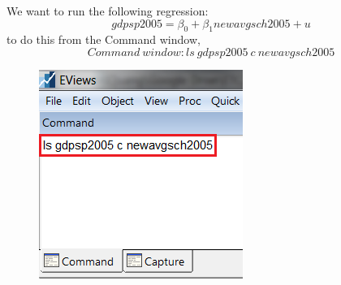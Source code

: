 \documentclass[12pt]{report}
\begin{document}
\vspace{-\baselineskip}
\noindent We want to run the following regression: $$gdpsp2005 = \beta_0 + \beta_1 newavgsch2005 + u$$
\noindent to do this from the Command window,
$$Command\ window: ls\ gdpsp2005\ c\ newavgsch2005$$
\begin{figure}[H]
	\centering
	\includegraphics{tute6_q4_6}
\end{figure}
\vspace{-\baselineskip}
\end{document}
